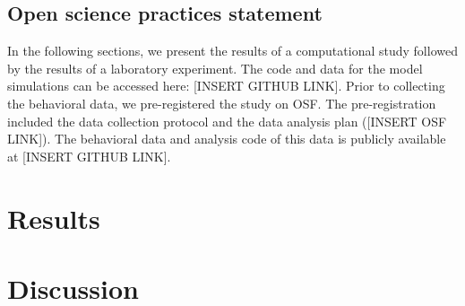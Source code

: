 \documentclass[12pt,a4paper]{article}
\begin{document}
\subsection{Open science practices statement}

In the following sections, we present the results of a computational study followed by the results of a laboratory experiment. The code and data for the model simulations can be accessed here: [INSERT GITHUB LINK]. Prior to collecting the behavioral data, we pre-registered the study on OSF. The pre-registration included the data collection protocol and the data analysis plan ([INSERT OSF LINK]). The behavioral data and analysis code of this data is publicly available at [INSERT GITHUB LINK].

\section*{Results} \label{sec:results}



\section*{Discussion} \label{sec:discussion}





\newpage
\printbibliography




\end{document}
